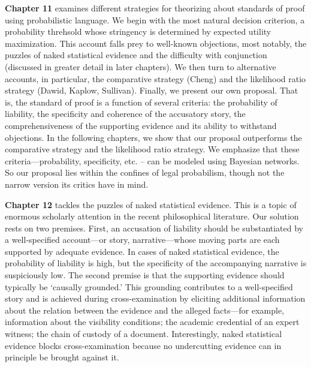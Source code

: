 \documentclass[
  10pt,
  dvipsnames,enabledeprecatedfontcommands]{scrartcl}
\begin{document}
\textbf{Chapter 11} examines different strategies for theorizing about
standards of proof using probabilistic language. We begin with the most
natural decision criterion, a probability threhsold whose stringency is
determined by expected utility maximization. This account falls prey to
well-known objections, most notably, the puzzles of naked statistical
evidence and the difficulty with conjunction (discussed in greater
detail in later chapters). We then turn to alternative accounts, in
particular, the comparative strategy (Cheng) and the likelihood ratio
strategy (Dawid, Kaplow, Sullivan). Finally, we present our own
proposal. That is, the standard of proof is a function of several
criteria: the probability of liability, the specificity and coherence of
the accusatory story, the comprehensiveness of the supporting evidence
and its ability to withstand objections. In the following chapters, we
show that our proposal outperforms the comparative strategy and the
likelihood ratio strategy. We emphasize that these
criteria---probability, specificity, etc. -- can be modeled using
Bayesian networks. So our proposal lies within the confines of legal
probabilism, though not the narrow version its critics have in mind.

\textbf{Chapter 12} tackles the puzzles of naked statistical evidence.
This is a topic of enormous scholarly attention in the recent
philosophical literature. Our solution rests on two premises. First, an
accusation of liability should be substantiated by a well-specified
account---or story, narrative---whose moving parts are each supported by
adequate evidence. In cases of naked statistical evidence, the
probability of liability is high, but the specificity of the
accompanying narrative is suspiciously low. The second premise is that
the supporting evidence should typically be `causally grounded.' This
grounding contributes to a well-specified story and is achieved during
cross-examination by eliciting additional information about the relation
between the evidence and the alleged
 facts---for example,
information about the visibility conditions; the academic credential of
an expert witness; the chain of custody of a document. Interestingly,
naked statistical evidence blocks cross-examination because no
undercutting evidence can in principle be brought against it.
\end{document}
